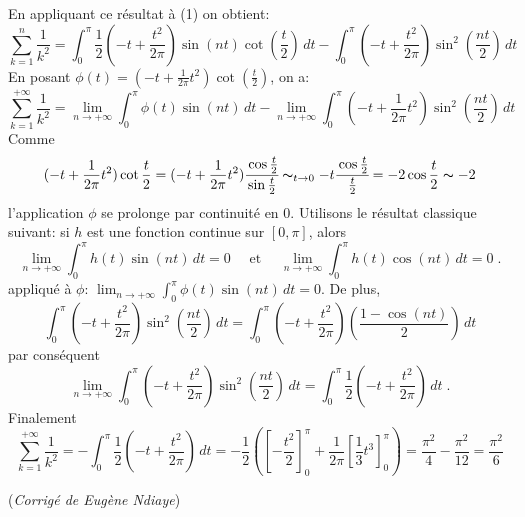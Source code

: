 {{En appliquant ce résultat à (1) on obtient:
\[  
\sum_{k = 1}^{n} \frac{1}{k^2} 
=  \int_{0}^{\pi} \frac{1}{2} \left(-t + \frac{t^2}{2\pi} \right) \sin(nt)\cot \left( \frac{t}{2} \right) \, dt 
- \int_{0}^{\pi} \left(-t + \frac{t^2}{2\pi} \right) \sin^2 \left(\frac{nt}{2} \right) \, dt  
\] 
En posant $ \phi (t) = (-t + \frac{1}{2\pi} t^2)\cot(\frac{t}{2}) $, on a:
\[ \sum_{k = 1}^{+\infty} \frac{1}{k^2} 
= \lim_{n \to +\infty} \int_{0}^{\pi} \phi (t)\sin(nt)\, dt 
- \lim_{n \to +\infty}\int_{0}^{\pi} \left(-t + \frac{1}{2\pi} t^2 \right) \sin^2 \left(\frac{nt}{2} \right) \, dt 
\]
Comme
\[ 
(-t + \frac{1}{2\pi} t^2)\cot \frac{t}{2}
= (-t + \frac{1}{2\pi} t^2) \cfrac{\cos \frac{t}{2}}{\sin \frac{t}{2}}  
\thicksim_{t \to 0} - t \cfrac{\cos \frac{t}{2}} {\frac{t}{2}} = - 2 \cos \frac{t}{2}
\thicksim - 2
\] 
l'application $\phi$ se prolonge par continuité en $0$.
Utilisons le résultat classique suivant: si $h$ est une fonction continue sur $[0, \pi]$, alors
\[ 
\lim_{n \to +\infty} \int_{0}^{\pi} h(t)\sin(nt)\, dt = 0 \quad \text{ et } \quad
\lim_{n \to +\infty} \int_{0}^{\pi} h(t)\cos(nt)\, dt = 0 \; .
\]
appliqué à $\phi$: $\lim_{n \to +\infty} \int_{0}^{\pi} \phi (t)\sin(nt)\, dt = 0$.
De plus, \[ \int_{0}^{\pi} \left(-t + \frac{t^2}{2\pi} \right) \sin^2 \left(\frac{nt}{2} \right) \, dt 
          = \int_{0}^{\pi} \left(-t + \frac{t^2}{2\pi} \right) \left(\frac{1 - \cos(nt)}{2} \right)\, dt 
\]
par conséquent 
\[
\lim_{n \to +\infty} \int_{0}^{\pi} \left(-t + \frac{t^2}{2\pi} \right) \sin^2 \left( \frac{nt}{2} \right) \, dt 
= \int_{0}^{\pi} \frac{1}{2} \left( -t + \frac{t^2}{2\pi} \right) \, dt \; .
\]
Finalement
\[ 
\sum_{k = 1}^{+\infty} \frac{1}{k^2} 
= - \int_{0}^{\pi} \frac{1}{2} \left(-t + \frac{t^2}{2\pi} \right) \, dt 
= -\frac{1}{2} \left( \left[ -\frac{t^2}{2} \right]_{0}^{\pi} + \frac{1}{2\pi} 
\left[ \frac{1}{3}t^3 \right]_{0}^{\pi} \right) 
= \frac{\pi^2}{4} - \frac{\pi^2}{12} = \frac{\pi^2}{6}
\]

\medskip

(\emph{Corrigé de Eugène Ndiaye})}
}